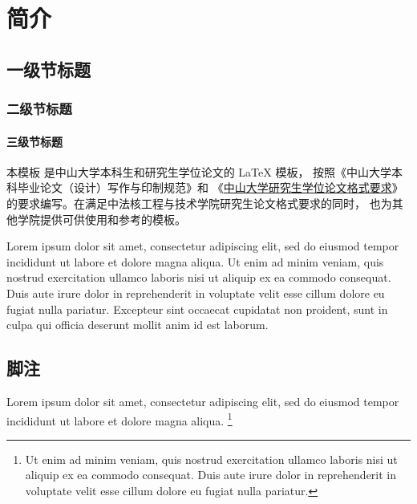 
\chapter{简介}

\section{一级节标题}

\subsection{二级节标题}

\subsubsection{三级节标题}


本模板  是中山大学本科生和研究生学位论文的 \LaTeX{}
模板\cite{knuth86a}， 按照《中山大学本科毕业论文（设计）写作与印制规范》和
《\href{https://graduate.sysu.edu.cn/sites/default/files/2019-04/中山大学研究生学位论文格式要求.pdf}
{中山大学研究生学位论文格式要求}》的要求编写。在满足中法核工程与技术学院研究生论文格式要求的同时，
也为其他学院提供可供使用和参考的模板。

Lorem ipsum dolor sit amet, consectetur adipiscing elit, sed do eiusmod tempor
incididunt ut labore et dolore magna aliqua.
Ut enim ad minim veniam, quis nostrud exercitation ullamco laboris nisi ut
aliquip ex ea commodo consequat.
Duis aute irure dolor in reprehenderit in voluptate velit esse cillum dolore eu
fugiat nulla pariatur.
Excepteur sint occaecat cupidatat non proident, sunt in culpa qui officia
deserunt mollit anim id est laborum.



\section{脚注}

Lorem ipsum dolor sit amet, consectetur adipiscing elit, sed do eiusmod tempor
incididunt ut labore et dolore magna aliqua.
\footnote{Ut enim ad minim veniam, quis nostrud exercitation ullamco laboris
  nisi ut aliquip ex ea commodo consequat.
  Duis aute irure dolor in reprehenderit in voluptate velit esse cillum dolore
  eu fugiat nulla pariatur.}

